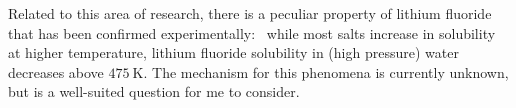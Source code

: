 \documentclass[titlepage,11pt]{article}
\begin{document}
Related to this area of research, there is a peculiar property of lithium fluoride that has been confirmed experimentally:~\cite{Booth1950} while most salts increase in solubility at higher temperature, lithium fluoride solubility in (high pressure) water decreases above $\SI{475}{\kelvin}$. The mechanism for this phenomena is currently unknown, but is a well-suited question for me to consider.

\singlespacing
\setlength{\bibsep}{0pt plus 0.0ex}


\end{document}
